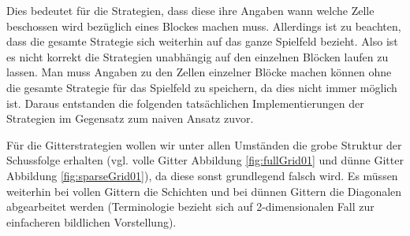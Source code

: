\documentclass[a4paper,12pt]{llncs}
\numberwithin{equation}{section}
\begin{document}
Dies bedeutet für die Strategien, dass diese ihre Angaben wann welche Zelle beschossen wird bezüglich eines Blockes machen muss. Allerdings ist zu beachten, dass die gesamte Strategie sich weiterhin auf das ganze Spielfeld bezieht. Also ist es nicht korrekt die Strategien unabhängig auf den einzelnen Blöcken laufen zu lassen. Man muss Angaben zu den Zellen einzelner Blöcke machen können ohne die gesamte Strategie für das Spielfeld zu speichern, da dies nicht immer möglich ist. Daraus entstanden die folgenden tatsächlichen Implementierungen der Strategien im Gegensatz zum naiven Ansatz zuvor.


Für die Gitterstrategien wollen wir unter allen Umständen die grobe Struktur der Schussfolge erhalten (vgl. volle Gitter Abbildung \ref{fig:fullGrid01} und dünne Gitter Abbildung \ref{fig:sparseGrid01}), da diese sonst grundlegend falsch wird. Es müssen weiterhin bei vollen Gittern die Schichten und bei dünnen Gittern die Diagonalen abgearbeitet werden (Terminologie bezieht sich auf 2-dimensionalen Fall zur einfacheren bildlichen Vorstellung).
\end{document}
